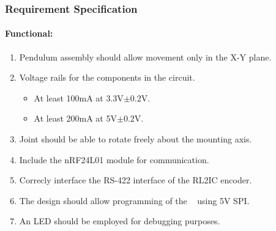 \subsubsection{Requirement Specification}
\label{subs:joint_requirements}

\paragraph{Functional:}
\begin{enumerate}[resume]
	\item Pendulum assembly should allow movement only in the X-Y plane. 
	\item Voltage rails for the components in the circuit.
	\begin{itemize}
		\item At least 100mA at 3.3V$\pm$0.2V.
		\item At least 200mA at 5V$\pm$0.2V.
	\end{itemize}
	\item Joint should be able to rotate freely about the mounting axis.
	\item Include the nRF24L01 module for communication.
	\item Correcly interface the RS-422 interface of the RL2IC encoder.
	\item The design should allow programming of the \texttt{ } using 5V SPI.
	\item An LED should be employed for debugging purposes.
\end{enumerate}

